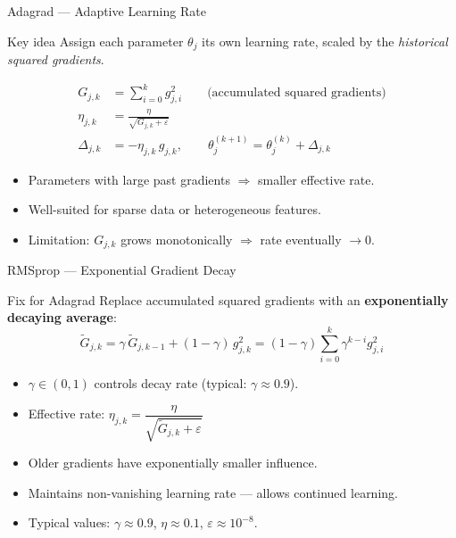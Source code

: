 \begin{frame}{Adagrad — Adaptive Learning Rate}
  \begin{block}{Key idea}
    Assign each parameter $\theta_j$ its own learning rate, scaled by the
    \emph{historical squared gradients}.
  \end{block}
  \vspace{4pt}
  \begin{align*}
    G_{j,k} &= \sum_{i=0}^{k} g_{j,i}^2 \qquad\text{(accumulated squared gradients)}\\[4pt]
    \eta_{j,k} &= \frac{\eta}{\sqrt{G_{j,k}+\varepsilon}}\\[4pt]
    \Delta_{j,k} &= -\eta_{j,k}\, g_{j,k}, \qquad
    \theta_j^{(k+1)} = \theta_j^{(k)} + \Delta_{j,k}
  \end{align*}
  \begin{itemize}
    \item Parameters with large past gradients $\Rightarrow$ smaller effective rate.
    \item Well-suited for sparse data or heterogeneous features.
    \item \textcolor{AlertRed}{Limitation}: $G_{j,k}$ grows monotonically $\Rightarrow$ rate eventually $\to 0$.
  \end{itemize}
\end{frame}

\begin{frame}{RMSprop — Exponential Gradient Decay}
  \begin{block}{Fix for Adagrad}
    Replace accumulated squared gradients with an
    \textbf{exponentially decaying average}:
    \[
      \tilde G_{j,k} = \gamma\,\tilde G_{j,k-1} + (1-\gamma)\,g_{j,k}^2
      = (1-\gamma)\sum_{i=0}^k \gamma^{k-i}g_{j,i}^2
    \]
  \end{block}
  \vspace{4pt}
  \begin{itemize}
    \item $\gamma\in(0,1)$ controls decay rate (typical: $\gamma\approx 0.9$).
    \item Effective rate: $\eta_{j,k} = \dfrac{\eta}{\sqrt{\tilde G_{j,k}+\varepsilon}}$
    \item Older gradients have exponentially smaller influence.
    \item Maintains non-vanishing learning rate — allows continued learning.
    \item Typical values: $\gamma\approx 0.9$, $\eta\approx 0.1$, $\varepsilon\approx 10^{-8}$.
  \end{itemize}
\end{frame}

